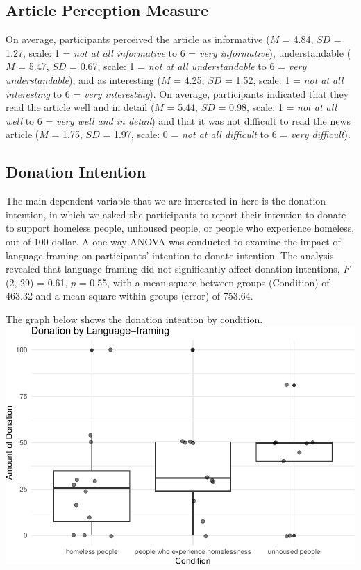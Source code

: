 \documentclass[
  man]{apa6}
\begin{document}
\hypertarget{article-perception-measure-1}{%
\subsection{Article Perception Measure}\label{article-perception-measure-1}}

On average, participants perceived the article as informative (\(M\) = 4.84, \(SD\) = 1.27, scale: 1 = \emph{not at all informative} to 6 = \emph{very informative}), understandable (\(M\) = 5.47, \(SD\) = 0.67, scale: 1 = \emph{not at all understandable} to 6 = \emph{very understandable}), and as interesting (\(M\) = 4.25, \(SD\) = 1.52, scale: 1 = \emph{not at all interesting} to 6 = \emph{very interesting}). On average, participants indicated that they read the article well and in detail (\(M\) = 5.44, \(SD\) = 0.98, scale: 1 = \emph{not at all well} to 6 = \emph{very well and in detail}) and that it was not difficult to read the news article (\(M\) = 1.75, \(SD\) = 1.97, scale: 0 = \emph{not at all difficult} to 6 = \emph{very difficult}).

\hypertarget{donation-intention-1}{%
\subsection{Donation Intention}\label{donation-intention-1}}

The main dependent variable that we are interested in here is the donation intention, in which we asked the participants to report their intention to donate to support homeless people, unhoused people, or people who experience homeless, out of 100 dollar. A one-way ANOVA was conducted to examine the impact of language framing on participants' intention to donate intention. The analysis revealed that language framing did not significantly affect donation intentions, \(F\)(2, 29) = 0.61, \(p\) = 0.55, with a mean square between groups (Condition) of 463.32 and a mean square within groups (error) of 753.64.

The graph below shows the donation intention by condition.
\includegraphics{d2m_final-project_files/figure-latex/unnamed-chunk-3-1.pdf}
\end{document}
